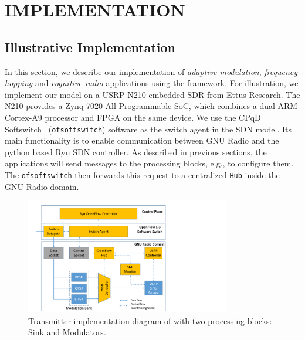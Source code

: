 \chapter{\uppercase {\crossflowcap Implementation}}
\label{sec:evaluation}

\section{Illustrative \crossflow Implementation}

In this section, we describe our implementation of \emph{adaptive modulation}, \emph{frequency hopping} and \emph{cognitive radio} applications using the \crossflow framework. For illustration, we implement our model on a USRP N210 embedded SDR from Ettus Research. The N210 provides a Zynq 7020 All Programmable SoC, which combines a dual ARM Cortex-A9 processor and FPGA on the same device. We use the CPqD Softswitch~\cite{ofsoftswitch13} (\texttt{ofsoftswitch}) software as the switch agent in the SDN model. Its main functionality is to enable communication between GNU Radio and the python based Ryu SDN controller. As described in previous sections, the applications will send messages to the processing blocks, e.g., to configure them. The \texttt{ofsoftswitch} then forwards this request to a centralized \texttt{\crossflow Hub} inside the GNU Radio domain. 

\begin{figure}[t]
  \centering
  \includegraphics[width=0.8\textwidth]{figures/Flowgraph.pdf}
  \caption{Transmitter implementation diagram of \crossflow with two processing blocks: Sink and Modulators.}
  \label{fig:flowgraph}
\end{figure}

